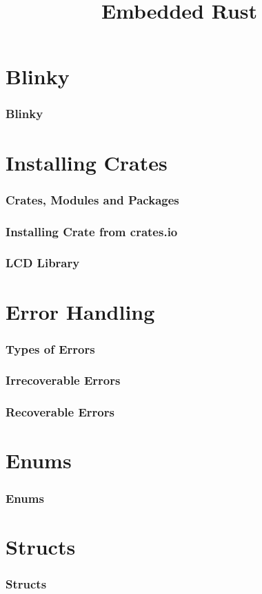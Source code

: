 \documentclass{beamer}
\title{Embedded Rust}
\begin{document}
\begin{frame}
  \titlepage{}
\end{frame}

\section{Blinky}
\begin{frame}
  \frametitle{Blinky}

\end{frame}

\section{Installing Crates}
\begin{frame}
  \frametitle{Crates, Modules and Packages}
\end{frame}

\begin{frame}
  \frametitle{Installing Crate from crates.io}
\end{frame}

\begin{frame}
  \frametitle{LCD Library}
\end{frame}

\section{Error Handling}
\begin{frame}
  \frametitle{Types of Errors}
\end{frame}

\begin{frame}
  \frametitle{Irrecoverable Errors}
\end{frame}

\begin{frame}
  \frametitle{Recoverable Errors}

\end{frame}

\section{Enums}
\begin{frame}
  \frametitle{Enums}

\end{frame}

\section{Structs}
\begin{frame}
  \frametitle{Structs}

\end{frame}
\end{document}
